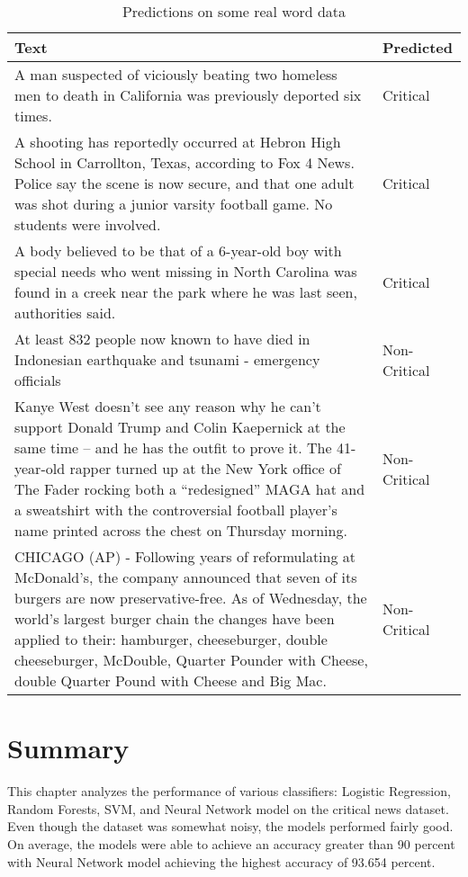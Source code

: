 \begin{table}
\begin{center}
\caption{Predictions on some real word data}
\label{tbl:real_prediction}
\begin{tabular}{p{12cm}p{2cm}}
\toprule 
Text&Predicted\\
\midrule 
A man suspected of viciously beating two homeless men to death in California was previously deported six times. &Critical \\
\hline
A shooting has reportedly occurred at Hebron High School in Carrollton, Texas, according to Fox 4 News.  Police say the scene is now secure, and that one adult was shot during a junior varsity football game. No students were involved. &Critical \\
\hline
A body believed to be that of a 6-year-old boy with special needs who went missing in North Carolina was found in a creek near the park where he was last seen, authorities said.&Critical \\
\hline
At least 832 people now known to have died in Indonesian earthquake and tsunami - emergency officials &Non-Critical \\
\hline
Kanye West doesn’t see any reason why he can’t support Donald Trump and Colin Kaepernick at the same time – and he has the outfit to prove it.  The 41-year-old rapper turned up at the New York office of The Fader rocking both a “redesigned” MAGA hat and a sweatshirt with the controversial football player’s name printed across the chest on Thursday morning.&Non-Critical \\
\hline
CHICAGO (AP) - Following years of reformulating at McDonald's, the company announced that seven of its burgers are now preservative-free. As of Wednesday, the world's largest burger chain the changes have been applied to their: hamburger, cheeseburger, double cheeseburger, McDouble, Quarter Pounder with Cheese, double Quarter Pound with Cheese and Big Mac. &Non-Critical \\
\bottomrule
\end{tabular}
\end{center}
\end{table}

\section{Summary}
This chapter analyzes the performance of various classifiers: Logistic Regression, Random Forests, SVM, and Neural Network model on the critical news dataset. Even though the dataset was somewhat noisy, the models performed fairly good. On average, the models were able to achieve an accuracy greater than 90 percent with Neural Network model achieving the highest accuracy of 93.654 percent.